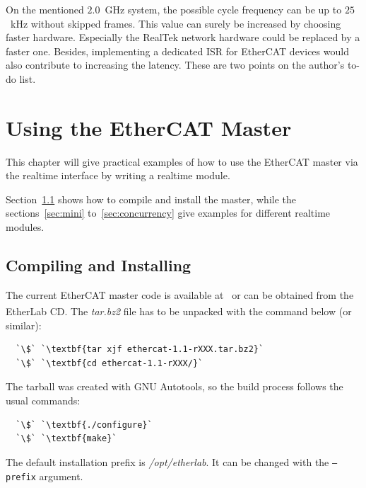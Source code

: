 \documentclass[a4paper,12pt,BCOR6mm,bibtotoc,idxtotoc]{scrbook}
\begin{document}
On the mentioned $2.0$~GHz system, the possible cycle frequency can be
up to $25$~kHz without skipped frames. This value can surely be
increased by choosing faster hardware. Especially the RealTek network
hardware could be replaced by a faster one. Besides, implementing a
dedicated ISR for EtherCAT devices would also contribute to increasing
the latency. These are two points on the author's to-do list.


\chapter{Using the EtherCAT Master}
\label{chapter:usage}

This chapter will give practical examples of how to use the EtherCAT
master via the realtime interface by writing a realtime module.

Section~\ref{sec:make} shows how to compile and install the master,
while the sections~\ref{sec:mini} to~\ref{sec:concurrency} give
examples for different realtime modules.


\section{Compiling and Installing}
\label{sec:make}

The current EtherCAT master code is available at~\cite{etherlab} or
can be obtained from the EtherLab\textsuperscript{\textregistered} CD.
The \textit{tar.bz2} file has to be unpacked with the command below
(or similar):

\begin{lstlisting}
  `\$` `\textbf{tar xjf ethercat-1.1-rXXX.tar.bz2}`
  `\$` `\textbf{cd ethercat-1.1-rXXX/}`
\end{lstlisting}

The tarball was created with GNU Autotools, so the build process
follows the usual commands:

\begin{lstlisting}
  `\$` `\textbf{./configure}`
  `\$` `\textbf{make}`
\end{lstlisting}

The default installation prefix is \textit{/opt/etherlab}. It can be
changed with the \texttt{--prefix} argument.
\end{document}
